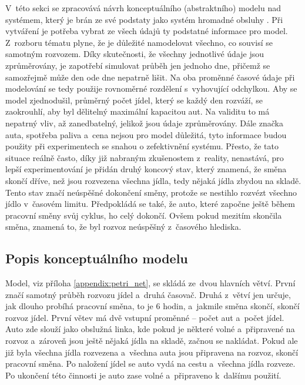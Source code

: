 \documentclass[a4paper, 11pt]{article}
\begin{document}
	V~této sekci se zpracovává návrh konceptuálního (abstraktního) modelu
	\cite[snímek 48]{IMS_slides} nad systémem, který je brán ze své podstaty
	jako systém hromadné obsluhy \cite[snímek 136]{IMS_slides}. Při vytváření
	je potřeba vybrat ze všech údajů ty podstatné informace pro model.
	Z~rozboru tématu plyne, že je důležité namodelovat všechno, co souvisí se
	samotným rozvozem. Díky skutečnosti, že všechny jednotlivé údaje jsou
	zprůměrovány, je zapotřebí simulovat průběh jen jednoho dne, přičemž se
	samozřejmě může den ode dne nepatrně lišit.	Na oba proměnné časové údaje
	při modelování se tedy použije rovnoměrné rozdělení
	\cite[snímek 89]{IMS_slides} s~vyhovující odchylkou. Aby se model
	zjednodušil, průměrný počet jídel, který se každý den rozváží, se
	zaokrouhlí, aby byl dělitelný maximální kapacitou aut. Na validitu to má
	nepatrný vliv, až zanedbatelný, jelikož jsou údaje zprůměrovány. Dále
	značka auta, spotřeba paliva a~cena nejsou pro model důležitá, tyto
	informace budou použity při experimentech se snahou o zefektivnění systému. Přesto, že tato
	situace reálně často, díky již nabraným zkušenostem z~reality, nenastává,
	pro lepší experimentování je přidán druhý koncový stav, který znamená,
	že směna skončí dříve, než jsou rozvezena všechna jídla, tedy nějaká
	jídla zbydou na skladě. Tento stav značí neúspěšné dokončení směny,
	protože se nestihlo rozvézt všechno jídlo v~časovém limitu. Předpokládá se
	také, že auto, které započne ještě během pracovní směny svůj cyklus, ho
	celý dokončí. Ovšem pokud mezitím skončila směna, znamená to, že byl
	rozvoz neúspěšný z~časového hlediska.


	\subsection{Popis konceptuálního modelu}
	\label{section:conceptual_model_desc}

	Model, viz příloha \ref{appendix:petri_net}, se skládá ze~dvou hlavních
	větví. První značí samotný průběh rozvozu jídel a~druhá časovač. Druhá
	z~větví jen určuje, jak dlouho probíhá pracovní směna, to je 6 hodin,
	a~jakmile směna skončí, skončí rozvoz jídel. První větev má dvě vstupní
	proměnné -- počet aut a~počet jídel. Auto zde slouží jako obslužná linka,
	kde pokud je některé volné a~připravené na rozvoz a~zároveň jsou ještě
	nějaká jídla na skladě, začnou se nakládat. Pokud ale již byla všechna
	jídla rozvezena a~všechna auta jsou připravena na rozvoz, skončí pracovní
	směna. Po naložení jídel se auto vydá na cestu a~všechna jídla rozveze.
	Po ukončení této činnosti je auto zase volné a~připraveno k~dalšímu použití.
\end{document}
